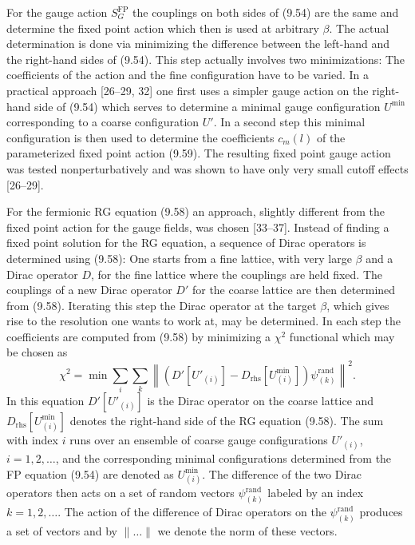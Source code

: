 For the gauge action $S^{\mathrm{FP}}_G$ the couplings on both sides of (9.54)
are the same and determine the fixed point action which then is used at
arbitrary $\beta$. The actual determination is done via minimizing the
difference between the left-hand and the right-hand sides of (9.54). This step
actually involves two minimizations: The coefficients of the action and the
fine configuration have to be varied. In a practical approach [26--29, 32] one
first uses a simpler gauge action on the right-hand side of (9.54) which
serves to determine a minimal gauge configuration $U^{\min}$ corresponding to
a coarse configuration $U'$. In a second step this minimal configuration is
then used to determine the coefficients $c_m(l)$ of the parameterized fixed
point action (9.59). The resulting fixed point gauge action was tested
nonperturbatively and was shown to have only very small cutoff effects
[26--29].

For the fermionic RG equation (9.58) an approach, slightly different from the
fixed point action for the gauge fields, was chosen [33--37]. Instead of
finding a fixed point solution for the RG equation, a sequence of Dirac
operators is determined using (9.58): One starts from a fine lattice, with very
large $\beta$ and a Dirac operator $D$, for the fine lattice where the
couplings are held fixed. The couplings of a new Dirac operator $D'$ for the
coarse lattice are then determined from (9.58). Iterating this step the Dirac
operator at the target $\beta$, which gives rise to the resolution one wants
to work at, may be determined. In each step the coefficients are computed from
(9.58) by minimizing a $\chi^2$ functional which may be chosen as
\begin{equation}
  \chi^2 = \min\sum_i\sum_k
    \left\|\left(D'[U'_{(i)}] - D_{\mathrm{rhs}}[U^{\min}_{(i)}]\right)
      \psi^{\mathrm{rand}}_{(k)}\right\|^2 .
\end{equation}
In this equation $D'[U'_{(i)}]$ is the Dirac operator on the coarse lattice
and $D_{\mathrm{rhs}}[U^{\min}_{(i)}]$ denotes the right-hand side of the RG
equation (9.58). The sum with index $i$ runs over an ensemble of coarse gauge
configurations $U'_{(i)}$, $i = 1, 2, \ldots$, and the corresponding minimal
configurations determined from the FP equation (9.54) are denoted as
$U^{\min}_{(i)}$. The difference of the two Dirac operators then acts on a set
of random vectors $\psi^{\mathrm{rand}}_{(k)}$ labeled by an index $k = 1, 2,
\ldots$. The action of the difference of Dirac operators on the
$\psi^{\mathrm{rand}}_{(k)}$ produces a set of vectors and by $\|\ldots\|$ we
denote the norm of these vectors.

